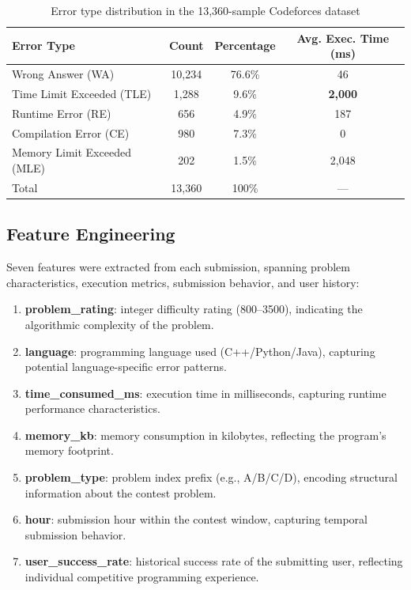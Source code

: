 \documentclass[acmsmall]{acmart}
\begin{document}
\begin{table}[htbp]
\centering
\caption{Error type distribution in the 13,360-sample Codeforces dataset}
\label{tab:error-dist}
\begin{tabular}{@{}lccc@{}}
\toprule
Error Type & Count & Percentage & Avg. Exec. Time (ms) \\
\midrule
Wrong Answer (WA)           & 10,234 & 76.6\% & 46 \\
Time Limit Exceeded (TLE)   & 1,288  & 9.6\% & \textbf{2,000} \\
Runtime Error (RE)          & 656    & 4.9\% & 187 \\
Compilation Error (CE)      & 980    & 7.3\% & 0 \\
Memory Limit Exceeded (MLE) & 202    & 1.5\% & 2,048 \\
\midrule
Total                       & 13,360 & 100\% & --- \\
\bottomrule
\end{tabular}
\end{table}

\subsection{Feature Engineering}

Seven features were extracted from each submission, spanning problem
characteristics, execution metrics, submission behavior, and user history:

\begin{enumerate}
    \item \textbf{problem\_rating}: integer difficulty rating (800--3500),
          indicating the algorithmic complexity of the problem.
    \item \textbf{language}: programming language used (C++/Python/Java),
          capturing potential language-specific error patterns.
    \item \textbf{time\_consumed\_ms}: execution time in milliseconds,
          capturing runtime performance characteristics.
    \item \textbf{memory\_kb}: memory consumption in kilobytes, reflecting
          the program's memory footprint.
    \item \textbf{problem\_type}: problem index prefix (e.g., A/B/C/D), encoding
          structural information about the contest problem.
    \item \textbf{hour}: submission hour within the contest window, capturing
          temporal submission behavior.
    \item \textbf{user\_success\_rate}: historical success rate of the submitting
          user, reflecting individual competitive programming experience.
\end{enumerate}
\end{document}
